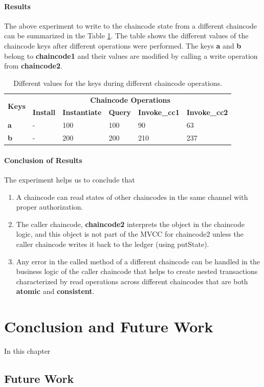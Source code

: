 \documentclass[
  a4paper,  %
  twoside,  %
  bibliography=totoc,
  headsepline,
  cleardoublepage=empty,
  parskip=half,
  draft=false
]{scrbook}
\begin{document}
\subsubsection{Results}
The above experiment to write to the chaincode state from a  different chaincode can be summarized in the Table \ref{tab:result2}. The table shows the different values of the chaincode keys after different operations were performed. The keys \textbf{a} and \textbf{b} belong to \textbf{chaincode1} and their values are modified by calling a write operation from \textbf{chaincode2}.
\begin{table}[h!]
\begin{center}
    \begin{tabular}{ |l|l|l|l|l|l|}
    \hline
    \multirow{2}{*}{\textbf{Keys}} & \multicolumn{5}{c|}{\textbf{Chaincode Operations}}\\ \cline{2-6}
    &\textbf{Install}& \textbf{Instantiate}& \textbf{Query}& \textbf{Invoke\_cc1}& \textbf{Invoke\_cc2} \\ \hline
    \textbf{a} & - & 100 & 100 & 90 & 63 \\ \hline
    \textbf{b} & - & 200 & 200 & 210 & 237 \\ \hline
    \end{tabular}
\end{center}
\caption{Different values for the keys during different chaincode operations.}
\label{tab:result2}
\end{table}
\subsubsection{Conclusion of Results}
The experiment helps us to conclude that \begin{enumerate}
    \item A chaincode can read states of other chaincodes in the same channel with proper authorization.
    \item The caller chaincode, \textbf{chaincode2} interprets the object in the chaincode logic, and this object is not part of the MVCC for chaincode2 unless the caller chaincode writes it back to the ledger (using putState). 
    \item Any error in the called method of a different chaincode can be handled in the business logic of the caller chaincode that helps to create nested transactions characterized by read operations across different chaincodes that are both \textbf{atomic} and \textbf{consistent}.
\end{enumerate}

\chapter{Conclusion and Future Work}
In this chapter
\label{chap:cf}
\section*{Future Work}


\printbibliography

\appendix
%

\pagestyle{empty}
\renewcommand*{\chapterpagestyle}{empty}
\Versicherung
\end{document}
